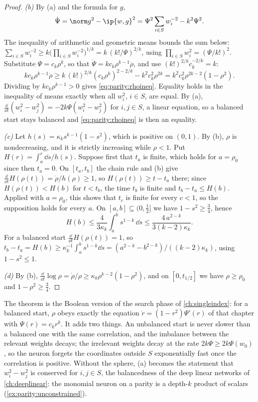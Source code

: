 \begin{refsection}
\begin{proof}
\emph{(b)} By (a) and the formula for $g$,
\[
  \dot\Psi=\norm g^2-\ip{w,g}^2=\Psi^2\sum_{i\in S}w_i^{-2}-k^2\Psi^2 .
\]
The inequality of arithmetic and geometric means bounds the sum below: $\sum_{i\in S}w_i^{-2}\ge k\bigl(\prod_{i\in S}w_i^{-2}\bigr)^{1/k}=k\,(k!/\Psi)^{2/k}$, using $\prod_{i\in S}w_i^2=(\Psi/k!)^2$. Substitute $\Psi=c_k\rho^k$, so that $\dot\Psi=kc_k\rho^{k-1}\dot\rho$, and use $(k!)^{2/k}c_k^{-2/k}=k$:
\[
  kc_k\rho^{k-1}\dot\rho\ge k\,(k!)^{2/k}(c_k\rho^k)^{2-2/k}-k^2c_k^2\rho^{2k}=k^2c_k^2\rho^{2k-2}(1-\rho^2).
\]
Dividing by $kc_k\rho^{k-1}>0$ gives \eqref{eq:parity:rhoineq}. Equality holds in the inequality of means exactly when all $w_i^2$, $i\in S$, are equal. By (a), $\frac{\dd}{\dd t}(w_i^2-w_j^2)=-2k\Psi(w_i^2-w_j^2)$ for $i,j\in S$, a linear equation, so a balanced start stays balanced and \eqref{eq:parity:rhoineq} is then an equality.

\emph{(c)} Let $h(s)=\kappa_ks^{k-1}(1-s^2)$, which is positive on $(0,1)$. By (b), $\rho$ is nondecreasing, and it is strictly increasing while $\rho<1$. Put $H(r)=\int_a^r\dd s/h(s)$. Suppose first that $t_a$ is finite, which holds for $a=\rho_0$ since then $t_a=0$. On $[t_a,t_b]$ the chain rule and (b) give $\frac{\dd}{\dd t}H(\rho(t))=\dot\rho/h(\rho)\ge1$, so $H(\rho(t))\ge t-t_a$ there; since $H(\rho(t))<H(b)$ for $t<t_b$, the time $t_b$ is finite and $t_b-t_a\le H(b)$. Applied with $a=\rho_0$, this shows that $t_c$ is finite for every $c<1$, so the supposition holds for every $a$. On $[a,b]\subseteq(0,\frac12]$ we have $1-s^2\ge\frac34$, hence
\[
  H(b)\le\frac4{3\kappa_k}\int_a^bs^{1-k}\,\dd s\le\frac{4\,a^{2-k}}{3(k-2)\kappa_k}.
\]
For a balanced start $\frac{\dd}{\dd t}H(\rho(t))=1$, so $t_b-t_a=H(b)\ge\kappa_k^{-1}\int_a^bs^{1-k}\dd s=(a^{2-k}-b^{2-k})/((k-2)\kappa_k)$, using $1-s^2\le1$.

\emph{(d)} By (b), $\frac{\dd}{\dd t}\log\rho=\dot\rho/\rho\ge\kappa_k\rho^{k-2}(1-\rho^2)$, and on $[0,t_{1/2}]$ we have $\rho\ge\rho_0$ and $1-\rho^2\ge\frac34$.
\end{proof}

The theorem is the Boolean version of the search phase of \cref{ch:singleindex}: for a balanced start, $\rho$ obeys exactly the equation $\dot r=(1-r^2)\Psi'(r)$ of that chapter with $\Psi(r)=c_kr^k$. It adds two things. An unbalanced start is never slower than a balanced one with the same correlation, and the imbalance between the relevant weights decays; the irrelevant weights decay at the rate $2k\Psi\ge2k\Psi(w_0)$, so the neuron forgets the coordinates outside $S$ exponentially fast once the correlation is positive. Without the sphere, (a) becomes the statement that $w_i^2-w_j^2$ is conserved for $i,j\in S$, the balancedness of the deep linear networks of \cref{ch:deeplinear}: the monomial neuron on a parity is a depth-$k$ product of scalars (\cref{ex:parity:unconstrained}).


\end{refsection}
